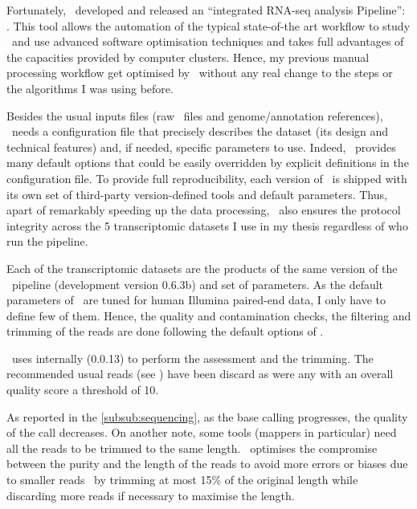 Fortunately, \nuno\ developed and released
an ``integrated RNA-seq analysis Pipeline'':
.
This tool allows the automation of the typical
state-of-the art workflow to study
\Rnaseq\ and use advanced software optimisation techniques and takes full
advantages of the capacities provided by computer clusters. Hence, my previous
manual processing workflow get optimised by \irap\ without any real change to
the steps or the algorithms I was using before.

Besides the usual inputs files (raw \Rnaseq\ files and genome/annotation
references), \irap\ needs a configuration file that precisely describes the
dataset (its design and technical features) and, if needed, specific parameters
to use. Indeed, \irap\ provides many default options that could be easily
overridden by explicit definitions in the configuration file. To provide
full reproducibility, each version of \irap\ is shipped with
its own set of third-party version-defined tools and default parameters. Thus,
apart of remarkably speeding up the data processing, \irap\
also ensures the protocol integrity across the 5 transcriptomic datasets I
use in my thesis regardless of who run the pipeline.

Each of the transcriptomic datasets are the products of the same version of
the \irap\ pipeline (development version 0.6.3b) and set of parameters. As the
default parameters of \irap\ are tuned for human Illumina paired-end data,
I only have to define few of them. Hence, the quality and contamination checks,
the filtering and trimming of the reads are done following the default options
of \irap.

\irap\ uses internally
 (0.0.13)
to perform the
assessment and the trimming. The recommended usual reads (see )
have been discard as were any with an overall quality score a threshold of 10.

As reported in the \cref{subsub:sequencing}, as the base calling progresses,
the quality of the call decreases.
On another note, some tools (mappers in particular) need
all the reads to be trimmed to the same length. \irap\ optimises the compromise
between the purity and the length of the reads to avoid more errors or
biases due to smaller reads~\mycite{Trimwisely} by trimming at most 15\% of the
original length while discarding more reads if necessary to maximise the length.


